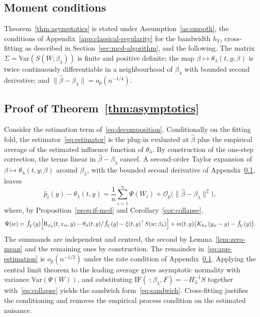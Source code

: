 \documentclass[11pt]{article}
\theoremstyle{plain}
\theoremstyle{definition}
\theoremstyle{remark}
\newcommand{\Var}{\mathbb{V}\text{ar}}
\newcommand{\pf}[1]{\ensuremath{\,\mathlarger{\textit{f}}_{#1}}}
\newcommand{\DensityRatio}{\text{R}}
\newcommand{\betahat}{\widehat{\beta}}
\newcommand{\cO}{\mathcal{O}}
\newcommand{\IF}{\mathrm{IF}}
\newcommand{\score}{S}
\begin{document}
\subsection{Moment conditions}
\label{app:asymptotics-conditions}

Theorem~\ref{thm:asymptotics} is stated under Assumption~\ref{as:smooth}, the conditions
of Appendix~\ref{app:classical-regularity} for the bandwidth $h_Y$, cross-fitting as
described in Section~\ref{sec:mcd-algorithm}, and the following. The matrix
$\Sigma = \Var(\score(W;\beta_\lambda))$ is finite and positive definite; the map
$\beta \mapsto \theta_\lambda(t,y;\beta)$ is twice continuously differentiable in a
neighbourhood of $\beta_\lambda$ with bounded second derivative; and
$\|\betahat - \beta_\lambda\| = o_p(n^{-1/4})$.

\subsection{Proof of Theorem~\ref{thm:asymptotics}}
\label{app:asymptotics-remainder}

Consider the estimation term of~\eqref{eq:decomposition}. Conditionally on the fitting
fold, the estimator~\eqref{eq:estimator} is the plug-in evaluated at $\betahat$ plus the
empirical average of the estimated influence function of $\theta_\lambda$. By
construction of the one-step correction, the terms linear in $\betahat - \beta_\lambda$
cancel. A second-order Taylor expansion of
$\beta \mapsto \theta_\lambda(t,y;\beta)$ around $\beta_\lambda$, with the bounded second
derivative of Appendix~\ref{app:asymptotics-conditions}, leaves
\begin{equation}
\widehat p_t(y) - \theta_\lambda(t,y)
= \frac{1}{n}\sum_{i=1}^{n} \Psi(W_i) + \cO_p\big( \|\betahat - \beta_\lambda\|^2 \big),
\label{eq:app-estimation}
\end{equation}
where, by Proposition~\ref{prop:if-mcd} and Corollary~\ref{cor:collapse},
\[
\Psi(w) = \pf{Y}(y)\Big[
\DensityRatio_{\beta_\lambda}(t,x_w,y) - \theta_\lambda(t,y)/\pf{Y}(y)
- \xi(t,y)^\top \score(w;\beta_\lambda) \Big]
+ m(t,y)\big( K_{h_Y}(y_w - y) - \pf{Y}(y) \big).
\]
The summands are independent and centred, the second by Lemma~\ref{lem:zero-mean} and the
remaining ones by construction. The remainder in~\eqref{eq:app-estimation} is
$o_p(n^{-1/2})$ under the rate condition of Appendix~\ref{app:asymptotics-conditions}.
Applying the central limit theorem to the leading average gives asymptotic normality with
variance $\Var(\Psi(W))$, and substituting
$\IF(\cdot;\beta_\lambda,F) = -H_\lambda^{-1}\score$ together
with~\eqref{eq:collapse} yields the sandwich form~\eqref{eq:sandwich}. Cross-fitting
justifies the conditioning and removes the empirical process condition on the estimated
nuisance.
\end{document}
